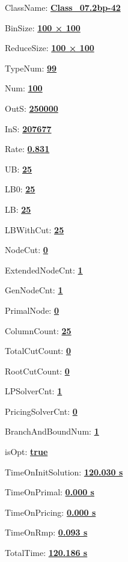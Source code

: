 \documentclass[11pt]{article}
\begin{document}
\pagestyle{empty}


ClassName: \underline{\textbf{Class_07.2bp-42}}
\par
BinSize: \underline{\textbf{100 × 100}}
\par
ReduceSize: \underline{\textbf{100 × 100}}
\par
TypeNum: \underline{\textbf{99}}
\par
Num: \underline{\textbf{100}}
\par
OutS: \underline{\textbf{250000}}
\par
InS: \underline{\textbf{207677}}
\par
Rate: \underline{\textbf{0.831}}
\par
UB: \underline{\textbf{25}}
\par
LB0: \underline{\textbf{25}}
\par
LB: \underline{\textbf{25}}
\par
LBWithCut: \underline{\textbf{25}}
\par
NodeCut: \underline{\textbf{0}}
\par
ExtendedNodeCnt: \underline{\textbf{1}}
\par
GenNodeCnt: \underline{\textbf{1}}
\par
PrimalNode: \underline{\textbf{0}}
\par
ColumnCount: \underline{\textbf{25}}
\par
TotalCutCount: \underline{\textbf{0}}
\par
RootCutCount: \underline{\textbf{0}}
\par
LPSolverCnt: \underline{\textbf{1}}
\par
PricingSolverCnt: \underline{\textbf{0}}
\par
BranchAndBoundNum: \underline{\textbf{1}}
\par
isOpt: \underline{\textbf{true}}
\par
TimeOnInitSolution: \underline{\textbf{120.030 s}}
\par
TimeOnPrimal: \underline{\textbf{0.000 s}}
\par
TimeOnPricing: \underline{\textbf{0.000 s}}
\par
TimeOnRmp: \underline{\textbf{0.093 s}}
\par
TotalTime: \underline{\textbf{120.186 s}}
\par
\newpage


\end{document}
